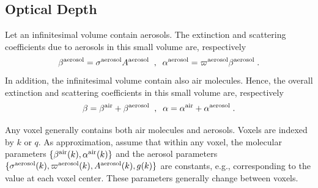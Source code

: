 \documentclass[10pt,twocolumn,letterpaper]{article}
\newcommand{\derivsym}[1]{\,d{#1}}
\begin{document}


\subsection{Optical Depth}
\label{sec:optical-depth}

Let an infinitesimal volume contain aerosols. The extinction and scattering coefficients
due to aerosols in this small volume are, respectively
\begin{equation}
  \beta^{\rm aerosol}=\sigma^{\rm aerosol} A^{\rm aerosol}
  \;\;,\;\;
  \alpha^{\rm aerosol}=\varpi^{\rm aerosol} \beta^{\rm aerosol}
  \;.
  \label{eq:betaer}
\end{equation}
In addition, the infinitesimal volume contain also air molecules. Hence, the overall
extinction and scattering coefficients in this small volume are, respectively
\begin{equation}
  \beta=\beta^{\rm air}+\beta^{\rm aerosol}
  \;\;,\;\;
  \alpha=\alpha^{\rm air}+\alpha^{\rm aerosol}
  \;.
  \label{eq:betaer}
\end{equation}

Any voxel generally contains both air molecules and aerosols. Voxels are indexed by $k$ or $q$.
As approximation, assume that within any voxel, the molecular parameters
$\{ \beta^{\rm air}(k),\alpha^{\rm air}(k)\}$ and the aerosol parameters
$\{ \sigma^{\rm aerosol}(k),\varpi^{\rm aerosol}(k), A^{\rm aerosol}(k),g(k)\}$
are constants, e.g., corresponding to the value at each voxel center. These parameters generally change
between voxels.
\end{document}
